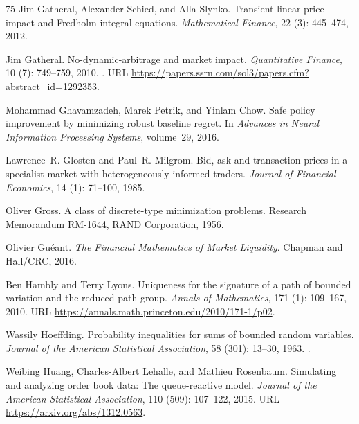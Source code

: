 \documentclass[11pt]{article}
\numberwithin{equation}{section}
\theoremstyle{definition}
\theoremstyle{remark}
\theoremstyle{definition}
\begin{document}
\begin{thebibliography}{75}
Jim Gatheral, Alexander Schied, and Alla Slynko.
\newblock Transient linear price impact and {F}redholm integral equations.
\newblock \emph{Mathematical Finance}, 22 (3): 445--474,
  2012.

Jim Gatheral.
\newblock No-dynamic-arbitrage and market impact.
\newblock \emph{Quantitative Finance}, 10 (7): 749--759,
  2010.
\newblock {}.
\newblock URL
  \url{https://papers.ssrn.com/sol3/papers.cfm?abstract_id=1292353}.

Mohammad Ghavamzadeh, Marek Petrik, and Yinlam Chow.
\newblock Safe policy improvement by minimizing robust baseline regret.
\newblock In \emph{Advances in Neural Information Processing Systems},
  volume~29, 2016.

Lawrence~R. Glosten and Paul~R. Milgrom.
\newblock Bid, ask and transaction prices in a specialist market with
  heterogeneously informed traders.
\newblock \emph{Journal of Financial Economics}, 14 (1):
  71--100, 1985.

Oliver Gross.
\newblock A class of discrete-type minimization problems.
\newblock Research Memorandum RM-1644, RAND Corporation, 1956.

Olivier Gu{\'e}ant.
\newblock \emph{The Financial Mathematics of Market Liquidity}.
\newblock Chapman and Hall/CRC, 2016.

Ben Hambly and Terry Lyons.
\newblock Uniqueness for the signature of a path of bounded variation and the
  reduced path group.
\newblock \emph{Annals of Mathematics}, 171 (1):
  109--167, 2010.
\newblock URL \url{https://annals.math.princeton.edu/2010/171-1/p02}.

Wassily Hoeffding.
\newblock Probability inequalities for sums of bounded random variables.
\newblock \emph{Journal of the American Statistical Association},
  58 (301): 13--30, 1963.
\newblock {}.

Weibing Huang, Charles-Albert Lehalle, and Mathieu Rosenbaum.
\newblock Simulating and analyzing order book data: The queue-reactive model.
\newblock \emph{Journal of the American Statistical Association}, 110
  (509): 107--122, 2015.
\newblock URL \url{https://arxiv.org/abs/1312.0563}.


\end{thebibliography}
\end{document}
